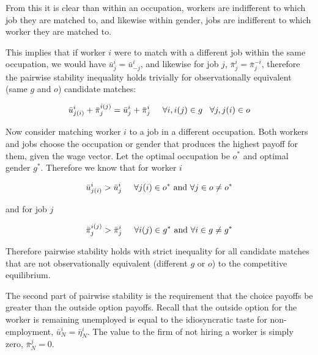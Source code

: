 \documentclass[12pt]{article}
\begin{document}
From this it is clear than within an occupation, workers are indifferent to which job they are matched to, and likewise within gender, jobs are indifferent to which worker they are matched to.

This implies that if worker $i$ were to match with a different job within the same occupation, we would have $\bar{u}^{i}_j =\bar{u}^{i}_{-j}$, and likewise for job $j$, $\bar{\pi}^{i}_j = \bar{\pi}^{-i}_j $, therefore the pairwise stability inequality holds trivially for observationally equivalent (same $g$ and $o$) candidate matches:

$$\bar{u}^{i}_{j(i)}+ \bar{\pi}^{i(j)}_j = \bar{u}^{i}_{j} + \bar{\pi}^{i}_j \hspace{5mm} \forall i,i(j) \in g \hspace{3mm} \forall j,j(i) \in o$$

Now consider matching worker $i$ to a job in a different occupation. Both workers and jobs choose the occupation or gender that produces the highest payoff for them, given the wage vector. Let the optimal occupation be $o^*$ and optimal gender $g^*$. Therefore we know that for worker $i$

$$\bar{u}^{i}_{j(i)} > \bar{u}^{i}_{j} \hspace{5mm} \forall j(i) \in o^* \text{  and  } \forall j \in o \neq o^*$$

and for job $j$

$$\bar{\pi}^{i(j)}_{j} > \bar{\pi}^{i}_j \hspace{5mm} \forall i(j) \in g^* \text{  and  } \forall i \in g \neq g^*$$

Therefore pairwise stability holds with strict inequality for all candidate matches that are not observationally equivalent (different $g$ or $o$) to the competitive equilibrium.

The second part of pairwise stability is the requirement that the choice payoffs be greater than the outside option payoffs. Recall that the outside option for the worker is remaining unemployed is equal to the idiosyncratic taste for non-employment, $ \bar{u}^i_N = \bar{\eta}^i_N$. The value to the firm of not hiring a worker is simply zero, $\bar{\pi}^j_N = 0$.

\end{document}
